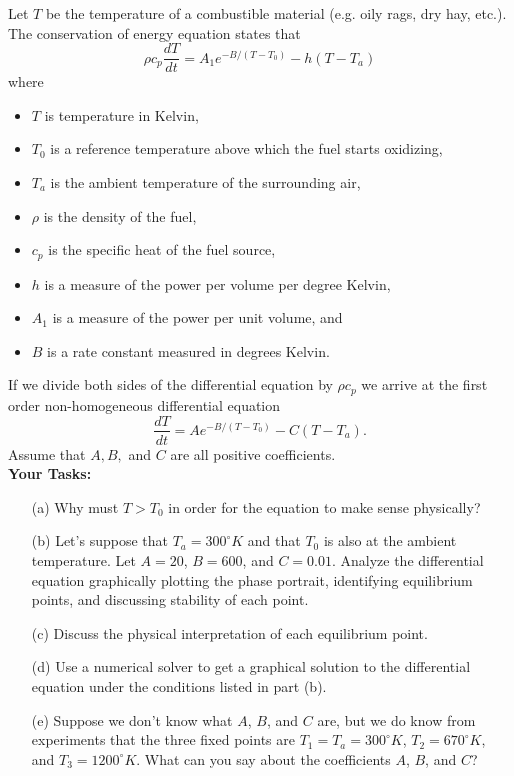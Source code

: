\begin{problem}
    Let $T$ be the temperature of a combustible material (e.g. oily rags, dry hay, etc.).
    The conservation of energy equation states that 
    \[ \rho c_p \frac{dT}{dt} = A_1 e^{-B/(T-T_0)} - h\left( T - T_a \right) \]
    where 
    \begin{itemize}
        \item $T$ is temperature in Kelvin,
        \item $T_0$ is a reference temperature above which the fuel starts oxidizing,
        \item $T_a$ is the ambient temperature of the surrounding air,
        \item $\rho$ is the density of the fuel,
        \item $c_p$ is the specific heat of the fuel source, 
        \item $h$ is a measure of the power per volume per degree Kelvin,
        \item $A_1$ is a measure of the power per unit volume, and
        \item $B$ is a rate constant measured in degrees Kelvin.
    \end{itemize}
    If we divide both sides of the differential equation by $\rho c_p$ we arrive at the
    first order non-homogeneous differential equation
    \[ \frac{dT}{dt} = A e^{-B/(T-T_0)} - C \left( T - T_a \right). \]  
    Assume that $A, B,$ and $C$ are all positive coefficients.
    \\{\bf Your Tasks:}
    \begin{enumerate}
        \item[(a)] Why must $T > T_0$ in order for the equation to make sense physically?
        \item[(b)] Let's suppose that $T_a = 300^\circ K$ and that $T_0$ is also at the
            ambient temperature.  Let $A = 20$, $B = 600$, and $C = 0.01$.  Analyze the
            differential equation graphically plotting the phase portrait, identifying
            equilibrium points, and discussing stability of each point.
        \item[(c)] Discuss the physical interpretation of each equilibrium point.
        \item[(d)] Use a numerical solver to get a graphical solution to the differential
            equation under the conditions listed in part (b).
        \item[(e)] Suppose we don't know what $A$, $B$, and $C$ are, but we do know from
            experiments that the three fixed points are $T_1 = T_a = 300^\circ K$, $T_2 =
            670^\circ K$, and $T_3 = 1200^\circ K$.  What can you say about the
            coefficients $A$, $B$, and $C$?
    \end{enumerate}
\end{problem}
